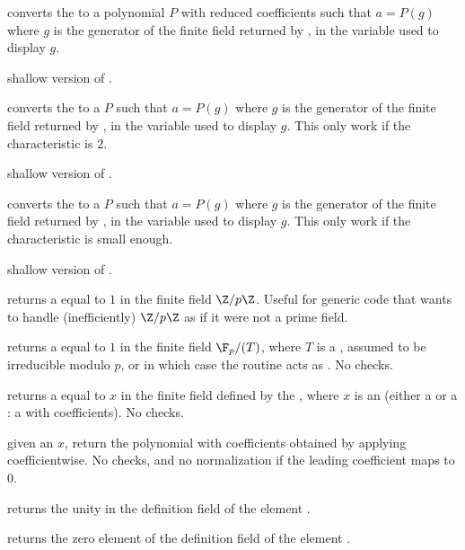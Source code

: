  converts the   to a polynomial
$P$ with reduced  coefficients such that $a=P(g)$ where $g$ is the
generator of the finite field returned by , in the variable used to
display $g$.

 shallow version of .

 converts the   to a 
$P$ such that $a=P(g)$ where $g$ is the generator of the finite field returned
by , in the variable used to display $g$. This only work if the
characteristic is $2$.

 shallow version of .

 converts the   to a 
$P$ such that $a=P(g)$ where $g$ is the generator of the finite field returned
by , in the variable used to display $g$. This only work if the
characteristic is small enough.

 shallow version of .

 returns a  equal to $1$ in the
finite field $\Z/p\Z$. Useful for generic code that wants to handle
(inefficiently) $\Z/p\Z$ as if it were not a prime field.

 returns a  equal to $1$ in the
finite field $\F_p/(T)$, where $T$ is a , assumed to be irreducible
modulo $p$, or  in which case the routine acts as .
No checks.

 returns a  equal to $x$
in the finite field defined by the  , where
$x$ is an  (either a  or a : a  with
 coefficients). No checks.

 given an  $x$,
return the polynomial with  coefficients obtained by
applying  coefficientwise. No checks, and no normalization
if the leading coefficient maps to $0$.

 returns the unity in the definition field of the
 element .

 returns the zero element of the definition field of
the  element .

